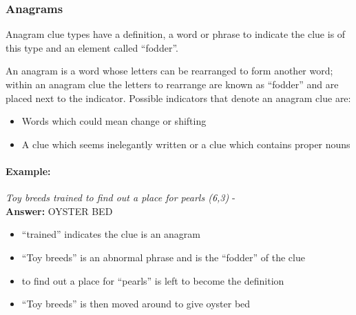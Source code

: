 \subsubsection{Anagrams}

Anagram clue types have a definition, a word or phrase to indicate the clue is
of this type and an element called ``fodder''.

An anagram is a word whose letters can be rearranged to form another word;
within an anagram clue the letters to rearrange are known as ``fodder'' and are
placed next to the indicator. Possible indicators that denote an anagram clue 
are:

\begin{itemize} 
    \item Words which could mean change or shifting 
    \item A clue which seems inelegantly written or a clue which contains 
    proper nouns
\end{itemize}

\paragraph{Example:} \emph{Toy breeds trained to find out a place for pearls (6,3)} - \citep{shuchiAnagram08} \\
\textbf{Answer:} OYSTER BED 

\begin{itemize}
    \item ``trained'' indicates the clue is an anagram   
    \item ``Toy breeds'' is an abnormal phrase and is the ``fodder'' of the clue 
    \item to find out a place for ``pearls'' is left to become the definition 
    \item ``Toy breeds'' is then moved around to give oyster bed 
\end{itemize}